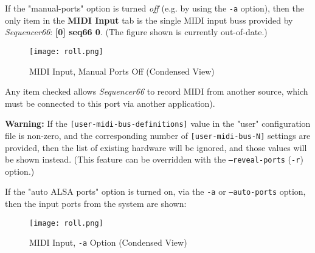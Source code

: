    If the "manual-ports" option is turned \textsl{off} (e.g. by using the
   \texttt{-a} option),
   then the only item in the \textbf{MIDI Input} tab is the single MIDI input
   buss provided by \textsl{Sequencer66}:  \textbf{[0] seq66 0}.
   (The figure shown is currently out-of-date.)


\begin{figure}[H]
   \centering 
   \texttt{[image: roll.png]}
   \caption{MIDI Input, Manual Ports Off (Condensed View)}
   \label{fig:seq66_midi_input_4_devices_manual_1}
\end{figure}



   Any item checked allows \textsl{Sequencer66} to record MIDI
   from another source,
   which must be connected to this port via
   another application).

   \textbf{Warning:}
   If the 
   \texttt{[user-midi-bus-definitions]} value in the "user" configuration file
   is non-zero, and the
   corresponding number of
   \texttt{[user-midi-bus-N]} settings are provided, then
   the list of existing hardware will be ignored, and those values will be
   shown instead.
   (This feature can be overridden with the
   \texttt{--reveal-ports} (\texttt{-r}) option.)


   If the "auto ALSA ports" option is turned on, via the \texttt{-a} or
   \texttt{--auto-ports} option, then
   the input ports from the system are shown:

\begin{figure}[H]
   \centering 
   \texttt{[image: roll.png]}
   \caption{MIDI Input, \texttt{-a} Option (Condensed View)}
   \label{fig:seq66_midi_input_4_devices_manual_0}
\end{figure}

